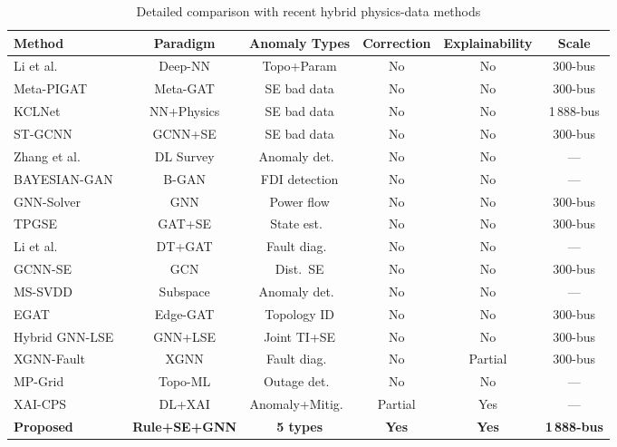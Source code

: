 \documentclass[research]{fcs}
\begin{document}
\begin{table}[htbp]
\centering
\footnotesize
\caption{Detailed comparison with recent hybrid physics-data methods}
\label{tab:method_comparison}
\begin{tabular}{@{}lccccc@{}}
\toprule
Method & Paradigm & Anomaly Types & Correction & Explainability & Scale \\
\midrule
Li et al.~\cite{li_topo_deep_nn2024} & Deep-NN & Topo+Param & No & No & 300-bus \\
Meta-PIGAT~\cite{meta_pigat_dsse2025} & Meta-GAT & SE bad data & No & No & 300-bus \\
KCLNet~\cite{kclnet2026} & NN+Physics & SE bad data & No & No & 1\,888-bus \\
ST-GCNN~\cite{spatiotemporal_gnn_se2024} & GCNN+SE & SE bad data & No & No & 300-bus \\
Zhang et al.~\cite{timeseries_anomaly_smartgrid2025} & DL Survey & Anomaly det.\ & No & No & --- \\
BAYESIAN-GAN~\cite{xu_bayesian_gan2024} & B-GAN & FDI detection & No & No & --- \\
GNN-Solver~\cite{donon_gnn_pf2019} & GNN & Power flow & No & No & 300-bus \\
TPGSE~\cite{tpgse2025} & GAT+SE & State est.\ & No & No & 300-bus \\
Li et al.~\cite{digital_twin_gat2026} & DT+GAT & Fault diag.\ & No & No & --- \\

GCNN-SE~\cite{donon_gcnn_se2021} & GCN & Dist.\ SE & No & No & 300-bus \\
MS-SVDD~\cite{debelle_mssvdd2026} & Subspace & Anomaly det.\ & No & No & --- \\
EGAT~\cite{egat2025} & Edge-GAT & Topology ID & No & No & 300-bus \\
Hybrid GNN-LSE~\cite{hybrid_gnn_lse2025} & GNN+LSE & Joint TI+SE & No & No & 300-bus \\
XGNN-Fault~\cite{xgnn_fault2025} & XGNN & Fault diag.\ & No & Partial & 300-bus \\
MP-Grid~\cite{mpgrid_topo2026} & Topo-ML & Outage det.\ & No & No & --- \\
XAI-CPS~\cite{xai_cps2026} & DL+XAI & Anomaly+Mitig.\ & Partial & Yes & --- \\
\textbf{Proposed} & \textbf{Rule+SE+GNN} & \textbf{5 types} & \textbf{Yes} & \textbf{Yes} & \textbf{1\,888-bus} \\
\bottomrule
\end{tabular}
\end{table}
\end{document}
